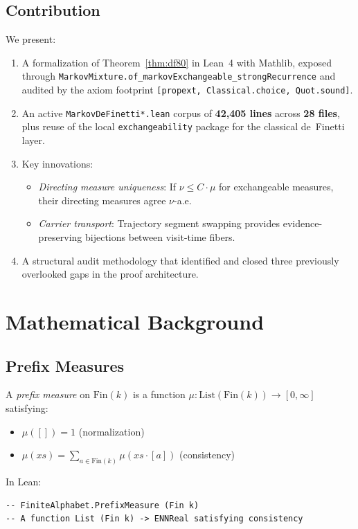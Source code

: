 \documentclass[11pt,a4paper]{article}
\theoremstyle{definition}
\begin{document}
\subsection{Contribution}

We present:
\begin{enumerate}
\item A formalization of Theorem~\ref{thm:df80} in Lean~4 with Mathlib,
  exposed through \texttt{MarkovMixture.of\_markovExchangeable\_strongRecurrence}
  and audited by the axiom footprint
  \texttt{[propext, Classical.choice, Quot.sound]}.
\item An active \texttt{MarkovDeFinetti*.lean} corpus of
  \textbf{42,405 lines} across \textbf{28 files}, plus reuse of the local
  \texttt{exchangeability} package for the classical de~Finetti layer.
\item Key innovations:
  \begin{itemize}
  \item \emph{Directing measure uniqueness}: If $\nu \leq C \cdot \mu$ for
    exchangeable measures, their directing measures agree $\nu$-a.e.
  \item \emph{Carrier transport}: Trajectory segment swapping provides
    evidence-preserving bijections between visit-time fibers.
  \end{itemize}
\item A structural audit methodology that identified and closed three
  previously overlooked gaps in the proof architecture.
\end{enumerate}

\section{Mathematical Background}

\subsection{Prefix Measures}

A \emph{prefix measure} on $\mathrm{Fin}(k)$ is a function
$\mu : \mathrm{List}(\mathrm{Fin}(k)) \to [0, \infty]$ satisfying:
\begin{itemize}
\item $\mu([]) = 1$ (normalization)
\item $\mu(xs) = \sum_{a \in \mathrm{Fin}(k)} \mu(xs \cdot [a])$ (consistency)
\end{itemize}

In Lean:
\begin{lstlisting}
-- FiniteAlphabet.PrefixMeasure (Fin k)
-- A function List (Fin k) -> ENNReal satisfying consistency
\end{lstlisting}
\end{document}
